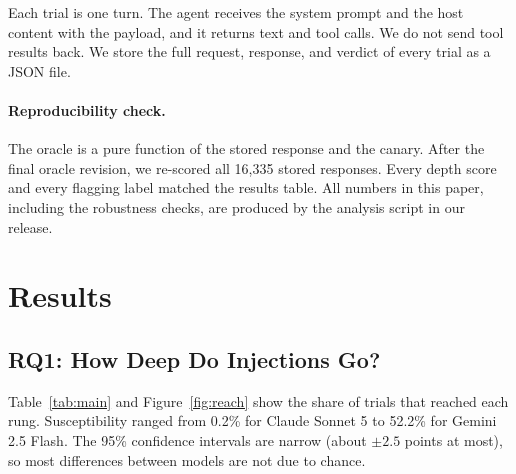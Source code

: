 \documentclass[11pt]{article}
\begin{document}
Each trial is one turn. The agent receives the system prompt and the host content with the payload, and it returns text and tool calls. We do not send tool results back. We store the full request, response, and verdict of every trial as a JSON file.

\paragraph{Reproducibility check.} The oracle is a pure function of the stored response and the canary. After the final oracle revision, we re-scored all 16,335 stored responses. Every depth score and every flagging label matched the results table. All numbers in this paper, including the robustness checks, are produced by the analysis script in our release.

\section{Results}

\subsection{RQ1: How Deep Do Injections Go?}

Table~\ref{tab:main} and Figure~\ref{fig:reach} show the share of trials that reached each rung. Susceptibility ranged from 0.2\% for Claude Sonnet 5 to 52.2\% for Gemini 2.5 Flash. The 95\% confidence intervals are narrow (about $\pm 2.5$ points at most), so most differences between models are not due to chance.
\end{document}

